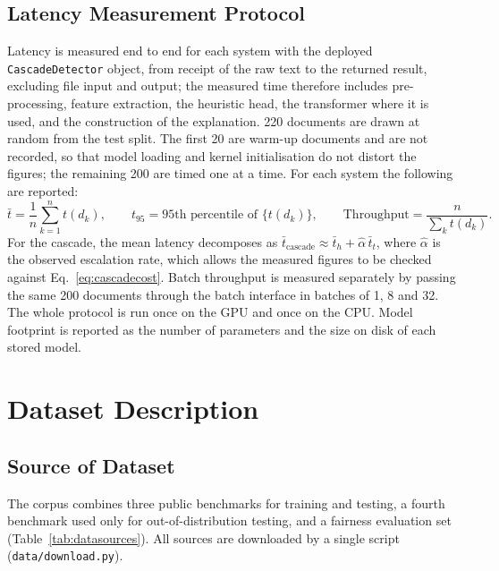 \subsection{Latency Measurement Protocol}

Latency is measured end to end for each system with the deployed
\texttt{CascadeDetector} object, from receipt of the raw text to the returned
result, excluding file input and output; the measured time therefore includes
pre-processing, feature extraction, the heuristic head, the transformer where
it is used, and the construction of the explanation. 220 documents are drawn
at random from the test split. The first 20 are warm-up documents and are not
recorded, so that model loading and kernel initialisation do not distort the
figures; the remaining 200 are timed one at a time. For each system the
following are reported:
\begin{equation}
  \bar{t} = \frac{1}{n}\sum_{k=1}^{n} t(d_k), \qquad
  t_{95} = \text{95th percentile of } \{t(d_k)\}, \qquad
  \text{Throughput} = \frac{n}{\sum_k t(d_k)} .
  \label{eq:latency}
\end{equation}
For the cascade, the mean latency decomposes as
$\bar{t}_{\text{cascade}} \approx \bar{t}_h + \hat{\alpha}\,\bar{t}_t$, where
$\hat{\alpha}$ is the observed escalation rate, which allows the measured
figures to be checked against Eq.~\eqref{eq:cascadecost}. Batch throughput is
measured separately by passing the same 200 documents through the batch
interface in batches of 1, 8 and 32. The whole protocol is run once on the
GPU and once on the CPU. Model footprint is reported as the number of
parameters and the size on disk of each stored model.

\section{Dataset Description}

\subsection{Source of Dataset}

The corpus combines three public benchmarks for training and testing, a
fourth benchmark used only for out-of-distribution testing, and a fairness
evaluation set (Table~\ref{tab:datasources}). All sources are downloaded by a
single script (\texttt{data/download.py}).

